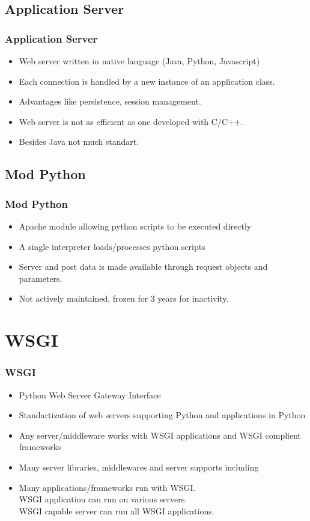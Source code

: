 \documentclass[trans,compress,xcolor=table]{beamer}
\begin{document}
\subsection{Application Server}
\begin{frame}
\frametitle{Application Server}
\begin{itemize}
\item Web server written in native language (Java, Python, Javascript)
\item Each connection is handled by a new instance of an application
	class.
\item Advantages like persistence,  session management.
\item Web server is not as efficient as one developed with C/C++.
\item Besides Java not much standart.
\end{itemize}
\end{frame}

\subsection{Mod Python}
\begin{frame}
\frametitle{Mod Python}
\begin{itemize}
\item Apache module allowing python scripts to be executed directly
\item A single interpreter loads/processes python scripts
\item Server and post data is made available through request
	objects and parameters.
\item Not actively maintained, frozen for 3 years for inactivity. 
\end{itemize}
\end{frame}

\section{WSGI}
\begin{frame}
\frametitle{WSGI}
\begin{itemize}
\item Python Web Server Gateway Interface
\item Standartization of web servers supporting Python and applications in Python
\item Any server/middleware works with WSGI applications and WSGI complient frameworks
\item Many server libraries, middlewares and server supports including 
\item Many applications/frameworks run with WSGI. \\
	WSGI application can run on various servers.\\
	WSGI capable server can run all WSGI applications.
\end{itemize}
\end{frame}
\end{document}
